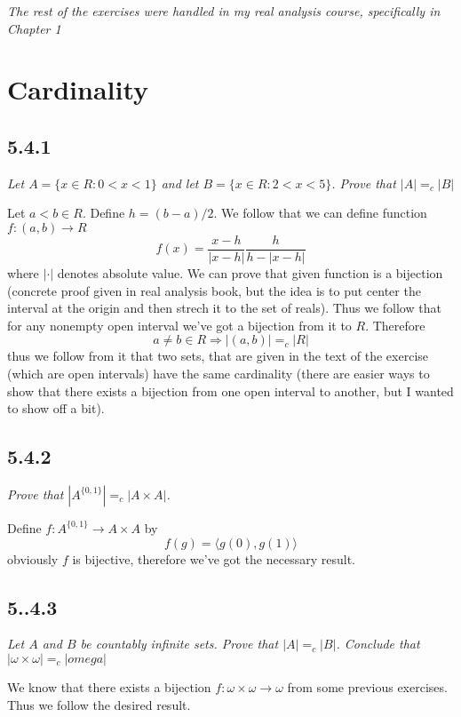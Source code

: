 \documentclass[11pt,oneside,titlepage]{book}
\DeclareMathOperator \ra {\Rightarrow}
\newcommand{\eangle}[1]{\langle #1 \rangle}
\begin{document}
\textit{The rest of the exercises were handled in my real analysis course, specifically in
  Chapter 1}

\section{Cardinality}

\subsection*{5.4.1}

\textit{Let $A = \{x \in R: 0 < x < 1\}$ and let $B = \{x \in R: 2 < x < 5\}$. Prove that
  $|A| =_c |B|$}

Let $a < b \in R$. Define $h = (b - a)/2$. We follow that we can define function $f: (a, b) \to R$
$$f(x) = \frac{x - h}{|x - h|} \frac{h}{h - |x - h|}$$
where $|\cdot|$ denotes absolute value. We can prove that given function
is a bijection (concrete proof given in real analysis book, but the
idea is to put center the interval at the origin and then strech it to the set of reals).
Thus we follow that for any nonempty open interval we've got a bijection from it to $R$. Therefore
$$a \neq b \in R \ra |(a, b)| =_c |R|$$
thus we follow from it that two sets, that are given in the
text of the exercise (which are open intervals) have the same
cardinality (there are easier ways to show that there exists a bijection from one
open interval to another, but I wanted to show off a bit).

\subsection{5.4.2}

\textit{Prove that $|A^{\{0, 1\}}| =_c |A \times A|$.}

Define $f: A^{\{0, 1\}} \to A \times A$ by
$$f(g) = \eangle{g(0), g(1)}$$
obviously $f$ is bijective, therefore we've got the necessary result.

\subsection*{5..4.3}

\textit{Let $A$ and $B$ be countably infinite sets. Prove that $|A| =_c |B|$. Conclude
  that $|\omega \times \omega| =_c |omega|$}

We know that there exists a bijection $f: \omega \times \omega \to \omega$ from some previous
exercises. Thus we follow the desired result.
\end{document}
